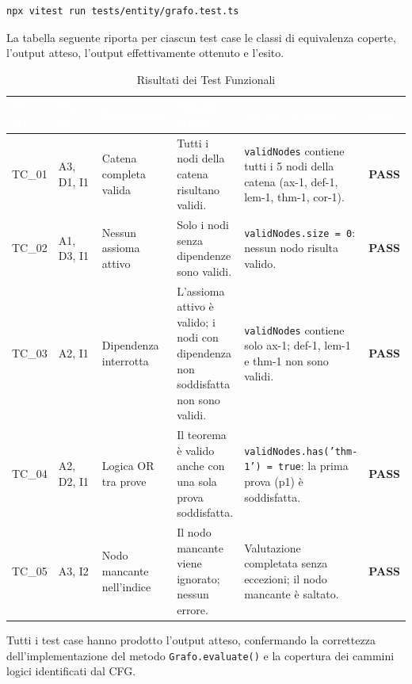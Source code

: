 \documentclass[12pt,a4paper]{article}
\begin{document}
\begin{lstlisting}[language=bash]
npx vitest run tests/entity/grafo.test.ts
\end{lstlisting}

La tabella seguente riporta per ciascun test case le classi di equivalenza coperte, l'output atteso, l'output effettivamente ottenuto e l'esito.

\begin{table}[H]
    \centering
    \footnotesize
    \begin{tabularx}{\textwidth}{|p{1cm}|p{1.5cm}|p{2.5cm}|X|X|p{1.3cm}|}
        \hline
        \rowcolor{PrimaryBlue} \textcolor{white}{\textbf{TC ID}} & \textcolor{white}{\textbf{Classi eq.}} & \textcolor{white}{\textbf{Descrizione}} & \textcolor{white}{\textbf{Output atteso}} & \textcolor{white}{\textbf{Output ottenuto}} & \textcolor{white}{\textbf{Esito}} \\
        \hline
        TC\_01 & A3, D1, I1 & Catena completa valida & Tutti i nodi della catena risultano validi. & \texttt{validNodes} contiene tutti i 5 nodi della catena (ax-1, def-1, lem-1, thm-1, cor-1). & \textbf{PASS} \\
        \hline
        \rowcolor{CodeBg} TC\_02 & A1, D3, I1 & Nessun assioma attivo & Solo i nodi senza dipendenze sono validi. & \texttt{validNodes.size = 0}: nessun nodo risulta valido. & \textbf{PASS} \\
        \hline
        TC\_03 & A2, I1 & Dipendenza interrotta & L'assioma attivo è valido; i nodi con dipendenza non soddisfatta non sono validi. & \texttt{validNodes} contiene solo ax-1; def-1, lem-1 e thm-1 non sono validi. & \textbf{PASS} \\
        \hline
        \rowcolor{CodeBg} TC\_04 & A2, D2, I1 & Logica OR tra prove & Il teorema è valido anche con una sola prova soddisfatta. & \texttt{validNodes.has('thm-1') = true}: la prima prova (p1) è soddisfatta. & \textbf{PASS} \\
        \hline
        TC\_05 & A3, I2 & Nodo mancante nell'indice & Il nodo mancante viene ignorato; nessun errore. & Valutazione completata senza eccezioni; il nodo mancante è saltato. & \textbf{PASS} \\
        \hline
    \end{tabularx}
    \caption{Risultati dei Test Funzionali}
\end{table}

Tutti i test case hanno prodotto l'output atteso, confermando la correttezza dell'implementazione del metodo \texttt{Grafo.evaluate()} e la copertura dei cammini logici identificati dal CFG.
\end{document}
